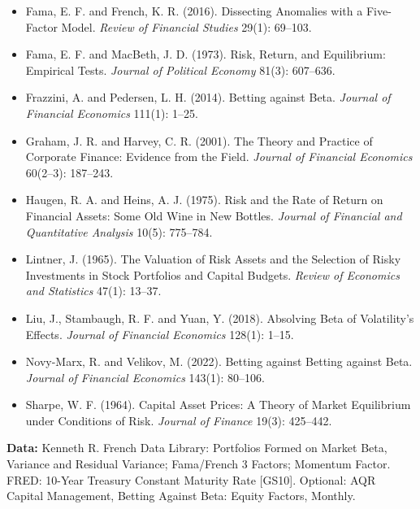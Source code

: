 \begin{itemize}
  \item Fama, E. F. and French, K. R. (2016). Dissecting Anomalies with a Five-Factor Model. \emph{Review of Financial Studies} 29(1): 69--103.
  \item Fama, E. F. and MacBeth, J. D. (1973). Risk, Return, and Equilibrium: Empirical Tests. \emph{Journal of Political Economy} 81(3): 607--636.
  \item Frazzini, A. and Pedersen, L. H. (2014). Betting against Beta. \emph{Journal of Financial Economics} 111(1): 1--25.
  \item Graham, J. R. and Harvey, C. R. (2001). The Theory and Practice of Corporate Finance: Evidence from the Field. \emph{Journal of Financial Economics} 60(2--3): 187--243.
  \item Haugen, R. A. and Heins, A. J. (1975). Risk and the Rate of Return on Financial Assets: Some Old Wine in New Bottles. \emph{Journal of Financial and Quantitative Analysis} 10(5): 775--784.
  \item Lintner, J. (1965). The Valuation of Risk Assets and the Selection of Risky Investments in Stock Portfolios and Capital Budgets. \emph{Review of Economics and Statistics} 47(1): 13--37.
  \item Liu, J., Stambaugh, R. F. and Yuan, Y. (2018). Absolving Beta of Volatility's Effects. \emph{Journal of Financial Economics} 128(1): 1--15.
  \item Novy-Marx, R. and Velikov, M. (2022). Betting against Betting against Beta. \emph{Journal of Financial Economics} 143(1): 80--106.
  \item Sharpe, W. F. (1964). Capital Asset Prices: A Theory of Market Equilibrium under Conditions of Risk. \emph{Journal of Finance} 19(3): 425--442.
\end{itemize}

\textbf{Data:} Kenneth R. French Data Library: Portfolios Formed on Market Beta, Variance and Residual Variance; Fama/French 3 Factors; Momentum Factor. FRED: 10-Year Treasury Constant Maturity Rate [GS10]. Optional: AQR Capital Management, Betting Against Beta: Equity Factors, Monthly.
